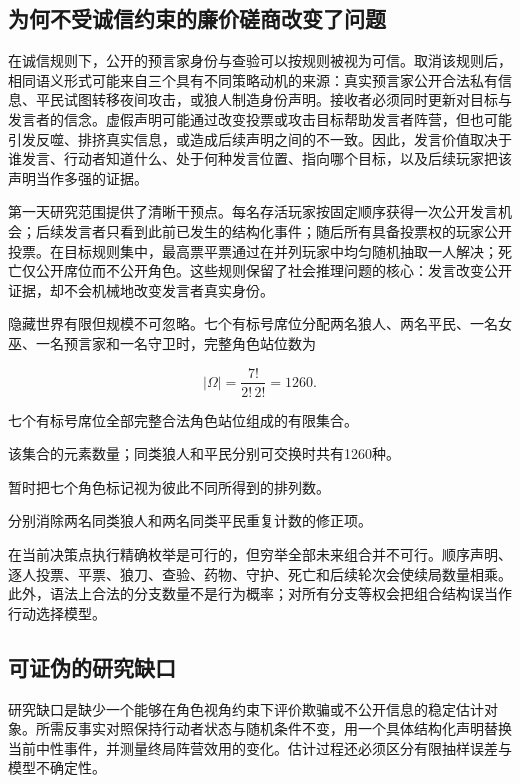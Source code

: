 \documentclass[UTF8,11pt,a4paper,fontset=windows]{ctexart}
\begin{document}
\subsection{为何不受诚信约束的廉价磋商改变了问题}

在诚信规则下，公开的预言家身份与查验可以按规则被视为可信。取消该规则后，相同语义形式可能来自三个具有不同策略动机的来源：真实预言家公开合法私有信息、平民试图转移夜间攻击，或狼人制造身份声明。接收者必须同时更新对目标与发言者的信念。虚假声明可能通过改变投票或攻击目标帮助发言者阵营，但也可能引发反噬、排挤真实信息，或造成后续声明之间的不一致。因此，发言价值取决于谁发言、行动者知道什么、处于何种发言位置、指向哪个目标，以及后续玩家把该声明当作多强的证据。

第一天研究范围提供了清晰干预点。每名存活玩家按固定顺序获得一次公开发言机会；后续发言者只看到此前已发生的结构化事件；随后所有具备投票权的玩家公开投票。在目标规则集中，最高票平票通过在并列玩家中均匀随机抽取一人解决；死亡仅公开席位而不公开角色。这些规则保留了社会推理问题的核心：发言改变公开证据，却不会机械地改变发言者真实身份。

隐藏世界有限但规模不可忽略。七个有标号席位分配两名狼人、两名平民、一名女巫、一名预言家和一名守卫时，完整角色站位数为

\[
|\Omega|=\frac{7!}{2!\,2!}=1260.
\]

\begin{description}[style=nextline,leftmargin=2.9cm,labelwidth=2.5cm]
  \item[$\Omega$] 七个有标号席位全部完整合法角色站位组成的有限集合。
  \item[$|\Omega|$] 该集合的元素数量；同类狼人和平民分别可交换时共有1260种。
  \item[$7!$] 暂时把七个角色标记视为彼此不同所得到的排列数。
  \item[$2!\,2!$] 分别消除两名同类狼人和两名同类平民重复计数的修正项。
\end{description}

在当前决策点执行精确枚举是可行的，但穷举全部未来组合并不可行。顺序声明、逐人投票、平票、狼刀、查验、药物、守护、死亡和后续轮次会使续局数量相乘。此外，语法上合法的分支数量不是行为概率；对所有分支等权会把组合结构误当作行动选择模型。

\subsection{可证伪的研究缺口}

研究缺口是缺少一个能够在角色视角约束下评价欺骗或不公开信息的稳定估计对象。所需反事实对照保持行动者状态与随机条件不变，用一个具体结构化声明替换当前中性事件，并测量终局阵营效用的变化。估计过程还必须区分有限抽样误差与模型不确定性。
\end{document}
